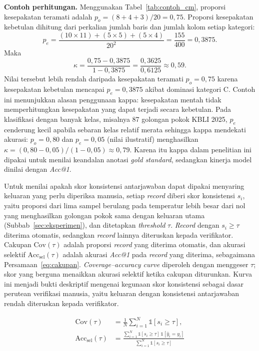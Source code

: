 \noindent\textbf{Contoh perhitungan.} Menggunakan Tabel~\ref{tab:contoh_cm}, proporsi kesepakatan teramati adalah $p_o = (8 + 4 + 3)/20 = 0{,}75$. Proporsi kesepakatan kebetulan dihitung dari perkalian jumlah baris dan jumlah kolom setiap kategori:
\[
  p_e = \frac{(10 \times 11) + (5 \times 5) + (5 \times 4)}{20^2} = \frac{155}{400} = 0{,}3875.
\]
Maka
\[
  \kappa = \frac{0{,}75 - 0{,}3875}{1 - 0{,}3875} = \frac{0{,}3625}{0{,}6125} \approx 0{,}59.
\]
Nilai tersebut lebih rendah daripada kesepakatan teramati $p_o = 0{,}75$ karena kesepakatan kebetulan mencapai $p_e = 0{,}3875$ akibat dominasi kategori C. Contoh ini menunjukkan alasan penggunaan kappa: kesepakatan mentah tidak memperhitungkan kesepakatan yang dapat terjadi secara kebetulan. Pada klasifikasi dengan banyak kelas, misalnya 87 golongan pokok KBLI 2025, $p_e$ cenderung kecil apabila sebaran kelas relatif merata sehingga kappa mendekati akurasi: $p_o = 0{,}80$ dan $p_e = 0{,}05$ (nilai ilustratif) menghasilkan $\kappa = (0{,}80 - 0{,}05)/(1 - 0{,}05) \approx 0{,}79$. Karena itu kappa dalam penelitian ini dipakai untuk menilai keandalan anotasi \textit{gold standard}, sedangkan kinerja model dinilai dengan \textit{Acc@1}.

Untuk menilai apakah skor konsistensi antarjawaban dapat dipakai menyaring keluaran yang perlu diperiksa manusia, setiap \textit{record} diberi skor konsistensi $s_i$, yaitu proporsi dari lima sampel berulang pada temperatur lebih besar dari nol yang menghasilkan golongan pokok sama dengan keluaran utama (Subbab~\ref{sec:eksperimen}), dan ditetapkan \textit{threshold} $\tau$. \textit{Record} dengan $s_i \geq \tau$ diterima otomatis, sedangkan \textit{record} lainnya diteruskan kepada verifikator. Cakupan $\text{Cov}(\tau)$ adalah proporsi \textit{record} yang diterima otomatis, dan akurasi selektif $\text{Acc}_{\text{sel}}(\tau)$ adalah akurasi \textit{Acc@1} pada \textit{record} yang diterima, sebagaimana Persamaan~\eqref{eq:cakupan}. \textit{Coverage--accuracy curve} diperoleh dengan menggeser $\tau$; skor yang berguna menaikkan akurasi selektif ketika cakupan diturunkan. Kurva ini menjadi bukti deskriptif mengenai kegunaan skor konsistensi sebagai dasar perutean verifikasi manusia, yaitu keluaran dengan konsistensi antarjawaban rendah diteruskan kepada verifikator.

\begin{equation}
  \begin{aligned}
    \text{Cov}(\tau) &= \frac{1}{N}\sum_{i=1}^{N} \mathbb{1}\left[s_i \geq \tau\right],\\
    \text{Acc}_{\text{sel}}(\tau) &= \frac{\sum_{i=1}^{N} \mathbb{1}\left[s_i \geq \tau\right]\,\mathbb{1}\left[\hat{y}_i = y_i\right]}{\sum_{i=1}^{N} \mathbb{1}\left[s_i \geq \tau\right]}
  \end{aligned}
  \label{eq:cakupan}
\end{equation}

